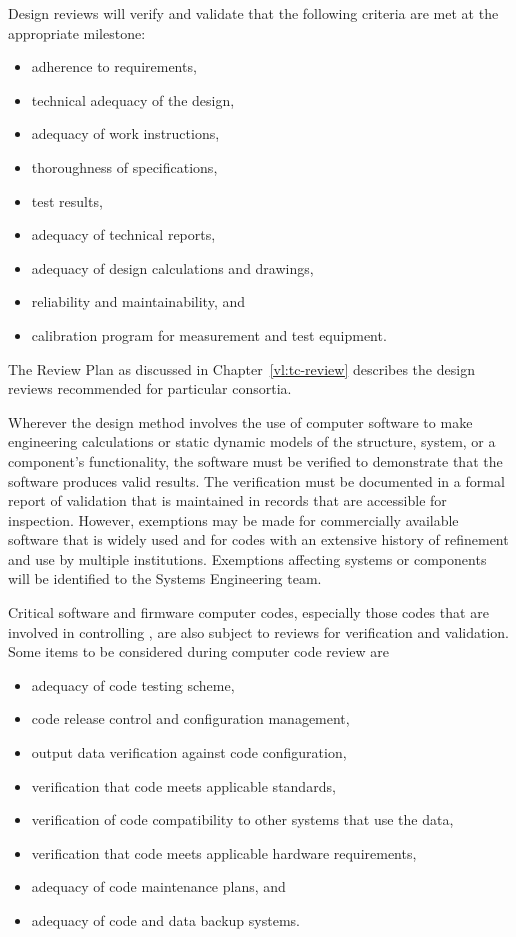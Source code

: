 Design reviews will verify and validate that the following criteria
are met at the appropriate milestone:
\begin{itemize}
 \item adherence to requirements,
 \item technical adequacy of the design,
 \item adequacy of work instructions,
 \item thoroughness of specifications,
 \item test results,
 \item adequacy of technical reports,
 \item adequacy of design calculations and drawings,
 \item reliability and maintainability, and
 \item calibration program for measurement and test equipment.
\end{itemize}
The  Review Plan as discussed in
Chapter~\ref{vl:tc-review} describes the design reviews recommended
for %
particular consortia.

Wherever the design method involves the use of
computer software to make engineering calculations or static dynamic
models of the structure, system, or a component's functionality, the
software must be verified to demonstrate that the software produces
valid results. The verification must be documented in a formal
report of validation that is maintained in records that are accessible
for inspection. However, exemptions may be made for commercially
available software that is widely used and for codes with an extensive
history of refinement and use by multiple institutions. Exemptions
affecting systems or components will be identified to the
 Systems Engineering team.

Critical software and firmware computer codes, especially those codes
that are involved in controlling  , are also subject to reviews for verification and
validation. Some items to be considered during computer code review
are
\begin{itemize}
\item adequacy of code testing scheme,
\item code release control and configuration management,
  \item output data verification against code configuration,
  \item verification that code meets applicable standards, 
  \item verification of code compatibility to other systems that use
    the data,
  \item verification that code meets applicable hardware requirements,
  \item adequacy of code maintenance plans, and
  \item adequacy of code and data backup systems.
\end{itemize}

